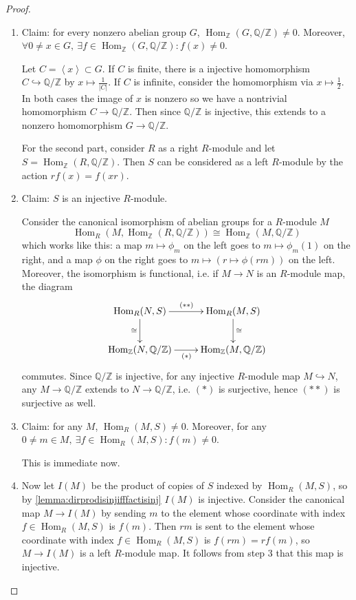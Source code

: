 \documentclass{article}
\newcommand{\la}{\left\langle}
\newcommand{\ra}{\right\rangle}
\newcommand{\Z}{\mathbb{Z}}
\newcommand{\Q}{\mathbb{Q}}
\newcommand{\Hom}{\operatorname{Hom}}
\theoremstyle{definition}
\begin{document}
\begin{proof}
\begin{enumerate}
\item Claim: for every nonzero abelian group $G$, $\Hom_\Z(G,\Q/\Z)\neq 0$. Moreover, $\forall 0\neq x\in G,\ \exists f\in\Hom_\Z(G,\Q/\Z):f(x)\neq 0$.

Let $C=\la x\ra\subset G$. If $C$ is finite, there is a injective homomorphism $C\hookrightarrow\Q/\Z$ by $x\mapsto\frac{1}{|C|}$. If $C$ is infinite, consider the homomorphism via $x\mapsto \frac12$. In both cases the image of $x$ is nonzero so we have a nontrivial homomorphism $C\rightarrow\Q/\Z$. Then since $\Q/\Z$ is injective, this extends to a nonzero homomorphism $G\rightarrow\Q/\Z$.

For the second part, consider $R$ as a right $R$-module and let $S=\Hom_\Z(R,\Q/\Z)$. Then $S$ can be considered as a left $R$-module by the action $rf(x)=f(xr)$.

\item Claim: $S$ is an injective $R$-module.

Consider the canonical isomorphism of abelian groups for a $R$-module $M$
\[
\Hom_R(M,\Hom_\Z(R,\Q/\Z))\cong\Hom_\Z(M,\Q/\Z)
\]
which works like this: a map $m\mapsto\phi_m$ on the left goes to $m\mapsto\phi_m(1)$ on the right, and a map $\phi$ on the right goes to $m\mapsto (r\mapsto\phi(rm))$ on the left. Moreover, the isomorphism is functional, i.e. if $M\rightarrow N$ is an $R$-module map, the diagram
\[
\xymatrix{
\Hom_R(N,S)\ar[r]^{(\ast\ast)}\ar[d]_\cong & \Hom_R(M,S)\ar[d]^\cong \\
\Hom_\Z(N,\Q/\Z)\ar[r]_{(\ast)} & \Hom_\Z(M,\Q/\Z)
}
\]
commutes. Since $\Q/\Z$ is injective, for any injective $R$-module map $M\hookrightarrow N$, any $M\rightarrow\Q/\Z$ extends to $N\rightarrow\Q/\Z$, i.e. $(\ast)$ is surjective, hence $(\ast\ast)$ is surjective as well.
\item Claim: for any $M$, $\Hom_R(M,S)\neq 0$. Moreover, for any $0\neq m\in M,\ \exists f\in\Hom_R(M,S):f(m)\neq 0$.

This is immediate now.

\item Now let $I(M)$ be the product of copies of $S$ indexed by $\Hom_R(M,S)$, so by \ref{lemma:dirprodisinjifffactisinj} $I(M)$ is injective. Consider the canonical map $M\rightarrow I(M)$ by sending $m$ to the element whose coordinate with index $f\in\Hom_R(M,S)$ is $f(m)$. Then $rm$ is sent to the element whose coordinate with index $f\in\Hom_R(M,S)$ is $f(rm)=rf(m)$, so $M\rightarrow I(M)$ is a left $R$-module map. It follows from step 3 that this map is injective.
\end{enumerate}
\end{proof}
\end{document}
